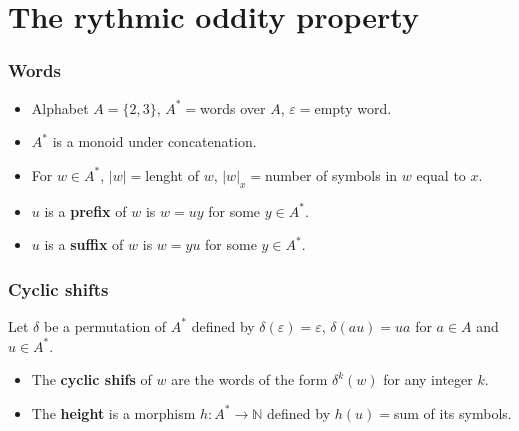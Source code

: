 \documentclass{beamer}
\theoremstyle{definition}
\begin{document}



\section{The rythmic oddity property}

\begin{frame}
\frametitle{Words}
\begin{itemize}
\item<1-> Alphabet $A=\{2,3\}$, $A^*=$words over $A$, $\varepsilon=$empty word. 
\item<2-> $A^*$ is a monoid under concatenation.
\item<3-> For $w\in A^*$, $|w|=$lenght of $w$, $|w|_x=$number of symbols in $w$ equal to $x$.
\item<4-> $u$ is a \textbf{prefix} of $w$ is $w=uy$ for some $y\in A^*$.
\item<5-> $u$ is a \textbf{suffix} of $w$ is $w=yu$ for some $y\in A^*$.
\end{itemize}
\end{frame}

\begin{frame}
\frametitle{Cyclic shifts}
Let $\delta$ be a permutation of $A^*$ defined by $\delta(\varepsilon)=\varepsilon$, $\delta(au)=ua$ for $a\in A$ and $u\in A^*$.

\begin{itemize}
\item<1-> The \textbf{cyclic shifs} of $w$ are the words of the form $\delta^k(w)$ for any integer $k$.
\end{itemize} 


\begin{itemize}
\item<3-> The \textbf{height} is a morphism $h:A^*\to\mathbb{N}$ defined by $h(u)=$sum of its symbols.
\end{itemize} 
\end{frame}
\end{document}
